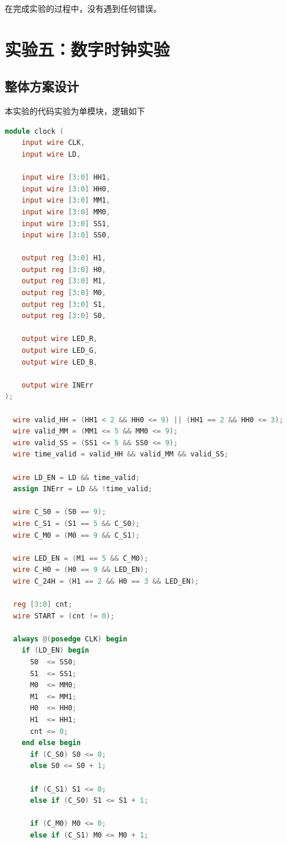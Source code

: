 \documentclass[12pt, a4paper]{ctexart}
\begin{document}
在完成实验的过程中，没有遇到任何错误。

\newpage

\section{实验五：数字时钟实验}

\subsection{整体方案设计}

本实验的代码实验为单模块，逻辑如下

\begin{lstlisting}[language=Verilog, caption={数字时钟模块}]
module clock (
    input wire CLK,
    input wire LD,

    input wire [3:0] HH1,
    input wire [3:0] HH0,
    input wire [3:0] MM1,
    input wire [3:0] MM0,
    input wire [3:0] SS1,
    input wire [3:0] SS0,

    output reg [3:0] H1,
    output reg [3:0] H0,
    output reg [3:0] M1,
    output reg [3:0] M0,
    output reg [3:0] S1,
    output reg [3:0] S0,

    output wire LED_R,
    output wire LED_G,
    output wire LED_B,

    output wire INErr
);

  wire valid_HH = (HH1 < 2 && HH0 <= 9) || (HH1 == 2 && HH0 <= 3);
  wire valid_MM = (MM1 <= 5 && MM0 <= 9);
  wire valid_SS = (SS1 <= 5 && SS0 <= 9);
  wire time_valid = valid_HH && valid_MM && valid_SS;

  wire LD_EN = LD && time_valid;
  assign INErr = LD && !time_valid;

  wire C_S0 = (S0 == 9);
  wire C_S1 = (S1 == 5 && C_S0);
  wire C_M0 = (M0 == 9 && C_S1);

  wire LED_EN = (M1 == 5 && C_M0);
  wire C_H0 = (H0 == 9 && LED_EN);
  wire C_24H = (H1 == 2 && H0 == 3 && LED_EN);

  reg [3:0] cnt;
  wire START = (cnt != 0);

  always @(posedge CLK) begin
    if (LD_EN) begin
      S0  <= SS0;
      S1  <= SS1;
      M0  <= MM0;
      M1  <= MM1;
      H0  <= HH0;
      H1  <= HH1;
      cnt <= 0;
    end else begin
      if (C_S0) S0 <= 0;
      else S0 <= S0 + 1;

      if (C_S1) S1 <= 0;
      else if (C_S0) S1 <= S1 + 1;

      if (C_M0) M0 <= 0;
      else if (C_S1) M0 <= M0 + 1;


\end{lstlisting}
\end{document}
